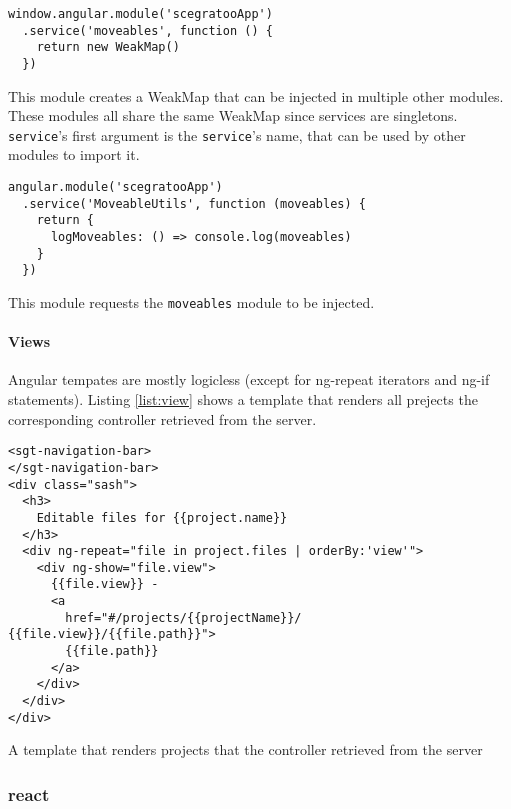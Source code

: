 \begin{listing}
  \begin{verbatim}
window.angular.module('scegratooApp')
  .service('moveables', function () {
    return new WeakMap()
  })
  \end{verbatim}
  \caption{This module creates a WeakMap that can be injected in multiple other modules. These modules all share the same WeakMap since services are singletons. \texttt{service}'s first argument is the \texttt{service}'s name, that can be used by other modules to import it.}
  \label{list:angularmodule}
\end{listing}

\begin{listing}
  \begin{verbatim}
angular.module('scegratooApp')
  .service('MoveableUtils', function (moveables) {
    return {
      logMoveables: () => console.log(moveables)
    }
  })
  \end{verbatim}
  \caption{This module requests the \texttt{moveables} module to be injected.}
  \label{list:depinj}
\end{listing}

\paragraph{Views}
\label{par:Views}

Angular tempates are mostly logicless
(except for ng-repeat iterators and ng-if statements). Listing \ref{list:view}
shows a template that renders all prejects the corresponding controller
retrieved from the server.

\begin{listing}
  \begin{verbatim}
<sgt-navigation-bar>
</sgt-navigation-bar>
<div class="sash">
  <h3>
    Editable files for {{project.name}}
  </h3>
  <div ng-repeat="file in project.files | orderBy:'view'">
    <div ng-show="file.view">
      {{file.view}} -
      <a
        href="#/projects/{{projectName}}/ {{file.view}}/{{file.path}}">
        {{file.path}}
      </a>
    </div>
  </div>
</div>
  \end{verbatim}
  \caption{A template that renders projects that the controller retrieved from the server}
  \label{list:view}
\end{listing}

\subsubsection{react}
\label{react}


